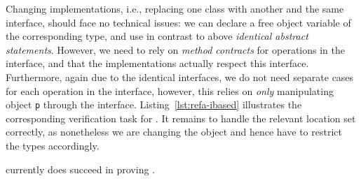 Changing implementations, i.e., replacing one class with another and the same interface,
should face no technical issues: we can declare a free object variable of the corresponding type,
and use in contrast to above \textit{identical abstract statements}.
However, we need to rely on \textit{method contracts} for operations in the interface, and that the implementations actually respect this interface.
Furthermore, again due to the identical interfaces, we do not need separate cases for each operation in the interface,
however, this relies on \textit{only} manipulating object \texttt{p} through the interface.
Listing~\ref{lst:refa-ibased} illustrates the corresponding verification task for \Refinity{}.
It remains to handle the relevant location set correctly, as nonetheless we are changing the object and hence have to restrict the types accordingly.

\Refinity{} currently does  succeed in proving .





%     
%     


